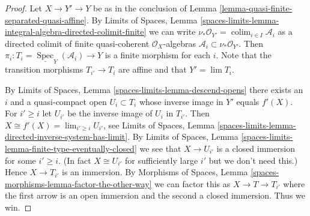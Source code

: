 \documentclass[10pt,a4paper]{amsart}
\theoremstyle{plain}
\theoremstyle{definition}
\theoremstyle{remark}
\numberwithin{equation}{subsection}
\def\lim{\mathop{\mathrm{lim}}\nolimits}
\def\colim{\mathop{\mathrm{colim}}\nolimits}
\def\Spec{\mathop{\mathrm{Spec}}}
\begin{document}
\begin{proof}
Let $X \to Y' \to Y$ be as in the conclusion of
Lemma \ref{lemma-quasi-finite-separated-quasi-affine}.
By
Limits of Spaces, Lemma
\ref{spaces-limits-lemma-integral-algebra-directed-colimit-finite}
we can write
$\nu_*\mathcal{O}_{Y'} = \colim_{i \in I} \mathcal{A}_i$ as a
directed colimit of finite quasi-coherent $\mathcal{O}_X$-algebras
$\mathcal{A}_i \subset \nu_*\mathcal{O}_{Y'}$. Then
$\pi_i : T_i = \underline{\Spec}_Y(\mathcal{A}_i) \to Y$
is a finite morphism for each $i$.
Note that the transition morphisms $T_{i'} \to T_i$ are affine
and that $Y' = \lim T_i$.

\medskip\noindent
By Limits of Spaces, Lemma \ref{spaces-limits-lemma-descend-opens}
there exists an $i$ and a quasi-compact open
$U_i \subset T_i$ whose inverse image in $Y'$ equals
$f'(X)$. For $i' \geq i$ let $U_{i'}$ be the inverse image
of $U_i$ in $T_{i'}$. Then $X \cong f'(X) = \lim_{i' \geq i} U_{i'}$, see
Limits of Spaces, Lemma
\ref{spaces-limits-lemma-directed-inverse-system-has-limit}.
By
Limits of Spaces, Lemma
\ref{spaces-limits-lemma-finite-type-eventually-closed} we see that
$X \to U_{i'}$ is a closed immersion for some $i' \geq i$.
(In fact $X \cong U_{i'}$ for sufficiently
large $i'$ but we don't need this.) Hence $X \to T_{i'}$ is an immersion. By
Morphisms of Spaces, Lemma
\ref{spaces-morphisms-lemma-factor-the-other-way}
we can factor this as $X \to T \to T_{i'}$ where the first arrow
is an open immersion and the second a closed immersion. Thus we win.
\end{proof}
\end{document}
